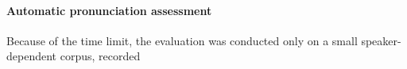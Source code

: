 \paragraph*{Automatic pronunciation assessment}
Because of the time limit, the evaluation was conducted only on a small speaker-dependent corpus, recorded 




